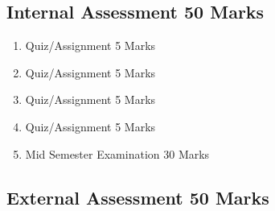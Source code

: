 \subsection*{Internal Assessment \hfill  50 Marks}
\begin{enumerate}
    \item Quiz/Assignment \hfill 5 Marks
    \item Quiz/Assignment \hfill 5 Marks
    \item Quiz/Assignment \hfill 5 Marks
    \item Quiz/Assignment \hfill 5 Marks
    \item Mid Semester Examination \hfill 30 Marks
\end{enumerate}
\subsection*{External Assessment \hfill  50 Marks}